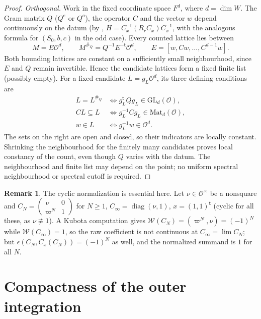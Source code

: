 \documentclass[11pt,oneside,notitlepage]{book}
\numberwithin{equation}{section}
\theoremstyle{plain}
\theoremstyle{definition}
\newtheorem{remark}[theorem]{Remark}
\newcommand{\cO}{\mathcal{O}}
\newcommand{\GL}{\mathrm{GL}}
\newcommand{\Mat}{\mathrm{Mat}}
\newcommand{\cW}{\mathcal{W}}
\newcommand{\diag}{\operatorname{diag}}
\newcommand{\hil}[2]{(#1,#2)}
\begin{document}
\begin{proof}
\emph{Orthogonal.} Work in the fixed coordinate space $F^d$, where $d=\dim W$. The Gram matrix $Q$ ($Q^e$ or $Q^o$), the operator $C$ and the vector $w$ depend continuously on the datum (by , $H=C_x^{-\mathsf t}(R_rC_x)C_x^{-1}$, with the analogous formula for $(S_0,b,c)$ in the odd case). Every counted lattice lies between
\[
 M=E\cO^d,\qquad M^{\#_Q}=Q^{-1}E^{-\mathsf t}\cO^d,
 \qquad E=[w,Cw,\dots,C^{d-1}w].
\]
Both bounding lattices are constant on a sufficiently small neighbourhood, since $E$ and $Q$ remain invertible. Hence the candidate lattices form a fixed finite list (possibly empty). For a fixed candidate $L=g_L\cO^d$, its three defining conditions are
\[
\begin{aligned}
 L=L^{\#_Q}&\iff g_L^{\mathsf t}Qg_L\in\GL_d(\cO),\\
 CL\subseteq L&\iff g_L^{-1}Cg_L\in\Mat_d(\cO),\\
 w\in L&\iff g_L^{-1}w\in\cO^d.
\end{aligned}
\]
The sets on the right are open and closed, so their indicators are locally constant. Shrinking the neighbourhood for the finitely many candidates proves local constancy of the count, even though $Q$ varies with the datum. The neighbourhood and finite list may depend on the point; no uniform spectral neighbourhood or spectral cutoff is required.
\end{proof}

\begin{remark}\label{rem:wall}
The cyclic normalization is essential here. Let $\nu\in\cO^\times$ be a nonsquare and $C_N=\left(\begin{smallmatrix}\nu&0\\\varpi^N&1\end{smallmatrix}\right)$ for $N\ge1$, $C_\infty=\diag(\nu,1)$, $x=(1,1)^{\mathsf t}$ (cyclic for all these, as $\nu\not\equiv1$). A Kubota computation gives $\cW(C_N)=\hil{\varpi^N}{\nu}=(-1)^N$ while $\cW(C_\infty)=1$, so the raw coefficient is not continuous at $C_\infty=\lim C_N$; but $\epsilon(C_N,C_x(C_N))=(-1)^N$ as well, and the normalized summand is $1$ for all $N$.
\end{remark}

\section{Compactness of the outer integration}
\end{document}
